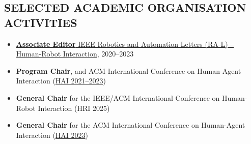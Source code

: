 
\subsection{SELECTED ACADEMIC ORGANISATION ACTIVITIES}
\vspace{2pt}

\begin{itemize}
    \item \href{https://www.ieee-ras.org/publications/ra-l/ra-letters-editorial-board#AssocEd}{\textbf{Associate Editor} IEEE Robotics and Automation Letters (RA-L) -- Human-Robot Interaction}, 2020--2023
    \item \textbf{Program Chair},  and  ACM International Conference on Human-Agent Interaction (\href{http://hai-conference.net/hai2021/}{HAI 2021--2023})
    \item \textbf{General Chair} for the  IEEE/ACM International Conference on Human-Robot Interaction (HRI 2025)
    \item \textbf{General Chair} for the  ACM International Conference on Human-Agent Interaction (\href{http://hai-conference.net/hai2023/}{HAI 2023})
\end{itemize}

